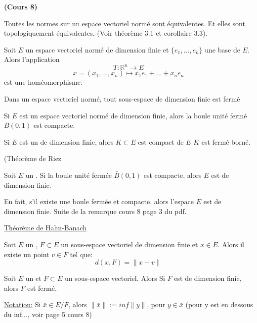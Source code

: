 \documentclass[12pt,a4paper]{article}
\begin{document}
\begin{flushleft}
\textbf{(Cours 8)}
\begin{cor} Toutes les normes sur un espace vectoriel normé sont équivalentes. Et elles sont topologiquement équivalentes. (Voir théorème 3.1 et corollaire 3.3).
\end{cor}

\begin{thm}
Soit $E$ un espace vectoriel normé de dimension finie et $ \{e_1, ..., e_n \}$ une base de $E$. Alors l'application $$T: \mathbb{R}^n \longrightarrow E$$ $$x = (x_1, ..., x_n) \mapsto x_1 e_1 + ... + x_n e_n$$ est une homéomorphisme.
\end{thm}

\begin{cor} 
Dans un espace vectoriel normé, tout sous-espace de dimension finie est fermé
\end{cor}

\begin{thm}
Si $E$ est un espace vectoriel normé de dimension finie, alors la boule unité fermé $\bar{B} (0,1)$ est compacte.
\end{thm}

\begin{thm}
Si $E$ est un \evn de dimension finie, alors $K \subset E$ est compact de $E$ \ssi $K$ est fermé borné.
\end{thm}

(Théorème de Riez
\begin{thm}
Soit $E$ un \evn . Si la boule unité fermée $\bar{B}(0,1)$ est compacte, alors $E$ est de dimension finie.
\end{thm}

\begin{rq}
En fait, s'il existe une boule fermée et compacte, alors l'espace $E$ est de dimension finie. Suite de la remarque cours 8 page 3 du pdf.
\end{rq}


\underline{Théorème de Hahn-Banach}
\begin{thm}
Soit $E$ un \evn , $F \subset E$ un sous-espace vectoriel de dimension finie et $x \in E$. Alors il existe un point $v \in F$ tel que: $$d(x,F) = \lVert x - v \rVert$$
\end{thm}


\begin{thm}
Soit $E$ un \evn et $F \subset E$ un sous-espace vectoriel. Alors Si $F$ est de dimension finie, alors $F$ est fermé.
\end{thm}

\underline{Notation:}
Si $\bar{x} \in E/F$, alors $\lVert \bar{x} \rVert := inf \lVert y \rVert$, pour $y \in \bar{x}$ (pour y est en dessous du inf..., voir page 5 cours 8)


\end{flushleft}
\end{document}
